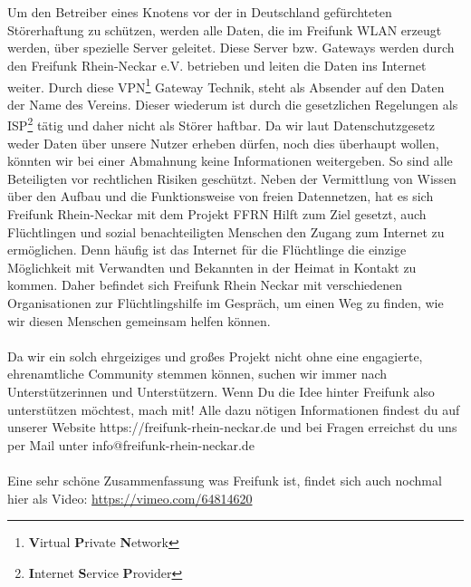\documentclass[10pt,a4paper]{article}
\begin{document}
\\\\
Um den Betreiber eines Knotens vor der in Deutschland gefürchteten Störerhaftung zu schützen, werden alle Daten, die im Freifunk WLAN erzeugt werden, über spezielle
Server geleitet. Diese Server bzw. Gateways werden durch den Freifunk Rhein-Neckar e.V. betrieben und leiten die Daten ins Internet weiter. Durch diese
VPN\footnote{\textbf{V}irtual \textbf{P}rivate \textbf{N}etwork} Gateway Technik, steht als Absender auf den Daten der Name des Vereins. Dieser wiederum ist durch die gesetzlichen Regelungen als ISP\footnote{\textbf{I}nternet \textbf{S}ervice \textbf{P}rovider} tätig und daher nicht als Störer
haftbar. Da wir laut Datenschutzgesetz weder Daten über unsere Nutzer erheben dürfen, noch dies überhaupt wollen, könnten wir bei einer Abmahnung keine Informationen weitergeben.
So sind alle Beteiligten vor rechtlichen Risiken geschützt.
\newpage
\noindent
Neben der Vermittlung von Wissen über den Aufbau und die Funktionsweise von freien Datennetzen, hat es sich Freifunk Rhein-Neckar mit dem Projekt \glqq FFRN Hilft\grqq{} zum Ziel gesetzt, auch Flüchtlingen und
sozial benachteiligten Menschen den Zugang zum Internet zu ermöglichen. Denn häufig ist das Internet für die Flüchtlinge die einzige Möglichkeit mit Verwandten und Bekannten in der Heimat in
Kontakt zu kommen. Daher befindet sich Freifunk Rhein Neckar mit verschiedenen Organisationen zur Flüchtlingshilfe im Gespräch, um einen Weg zu finden, wie wir diesen Menschen gemeinsam helfen können.
\\\\
Da wir ein solch ehrgeiziges und großes Projekt nicht ohne eine engagierte, ehrenamtliche Community stemmen können, suchen wir immer nach Unterstützerinnen und Unterstützern. Wenn Du die Idee hinter Freifunk also
unterstützen möchtest, mach mit! Alle dazu nötigen Informationen findest du auf unserer Website https://freifunk-rhein-neckar.de und bei Fragen erreichst du uns per Mail unter info@freifunk-rhein-neckar.de
\\\\
Eine sehr schöne Zusammenfassung was Freifunk ist, findet sich auch nochmal hier als Video: \url{https://vimeo.com/64814620}
\end{document}
